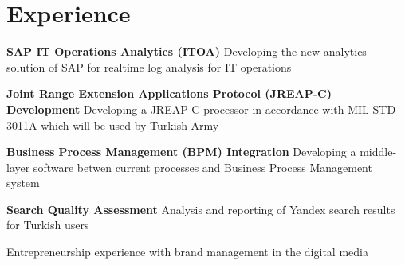 \section{Experience}


\vspace{\topsep} %
\begin{tightitemize}
  \item \textbf{SAP IT Operations Analytics (ITOA)} Developing the new analytics solution of SAP for realtime log analysis for IT operations
\end{tightitemize}

\sectionspace %



\begin{tightitemize}
\item \textbf{Joint Range Extension Applications Protocol (JREAP-C) Development} Developing a JREAP-C processor in accordance with MIL-STD-3011A which will be used by Turkish Army
\item \textbf{Business Process Management (BPM) Integration} Developing a middle-layer software betwen current processes and
Business Process Management system
\end{tightitemize}

\sectionspace %



\begin{tightitemize}
\item \textbf{Search Quality Assessment} Analysis and reporting of Yandex search results for Turkish users
\end{tightitemize}

\sectionspace %



\begin{tightitemize}
\item Entrepreneurship experience with brand management in the digital media
\end{tightitemize}

\sectionspace %
